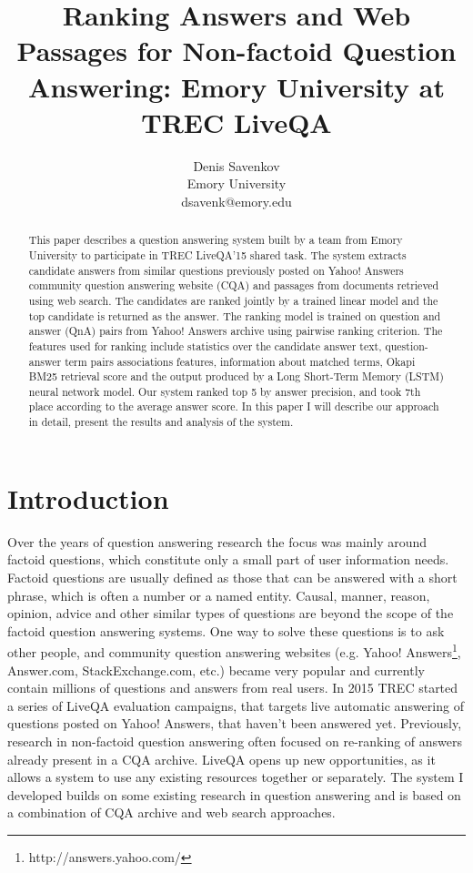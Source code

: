 \documentclass[]{article}
\title{Ranking Answers and Web Passages for Non-factoid Question Answering: Emory University at TREC LiveQA}
\author{Denis Savenkov\\Emory University\\dsavenk@emory.edu}
\date{}
\begin{document}
\maketitle

\begin{abstract}
This paper describes a question answering system built by a team from Emory University to participate in TREC LiveQA'15 shared task.
The system extracts candidate answers from similar questions previously posted on Yahoo! Answers community question answering website (CQA) and passages from documents retrieved using web search.
The candidates are ranked jointly by a trained linear model and the top candidate is returned as the answer.
The ranking model is trained on question and answer (QnA) pairs from Yahoo! Answers archive using pairwise ranking criterion.
The features used for ranking include statistics over the candidate answer text, question-answer term pairs associations features, information about matched terms, Okapi BM25 retrieval score and the output produced by a Long Short-Term Memory (LSTM) neural network model.
Our system ranked top 5 by answer precision, and took 7th place according to the average answer score.
In this paper I will describe our approach in detail, present the results and analysis of the system.

\end{abstract}

\section{Introduction}
Over the years of question answering research the focus was mainly around factoid questions, which constitute only a small part of user information needs.
Factoid questions are usually defined as those that can be answered with a short phrase, which is often a number or a named entity.
Causal, manner, reason, opinion, advice and other similar types of questions are beyond the scope of the factoid question answering systems.
One way to solve these questions is to ask other people, and community question answering websites (e.g. Yahoo! Answers\footnote{http://answers.yahoo.com/}, Answer.com, StackExchange.com, etc.) became very popular and currently contain millions of questions and answers from real users.
In 2015 TREC started a series of LiveQA evaluation campaigns, that targets live automatic answering of questions posted on Yahoo! Answers, that haven't been answered yet.
Previously, research in non-factoid question answering often focused on re-ranking of answers already present in a CQA archive.
LiveQA opens up new opportunities, as it allows a system to use any existing resources together or separately.
The system I developed builds on some existing research in question answering and is based on a combination of CQA archive and web search approaches.
\end{document}
